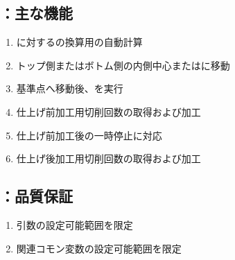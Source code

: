 \subsection{\KEndFaceInCChamferRLeft：主な機能}
\begin{enumerate}[label*=\sarrow]
\item \EndFaceInRChamfer に対するの換算用\EndFaceInCChamferWidth の自動計算
\item トップ側またはボトム側の\EndFace 内側中心または\IncutBoringMillingReferencePoint に移動
\item 基準点へ移動後、\KILeftFF を実行
\item 仕上げ前加工用切削回数の取得および加工
\item 仕上げ前加工後の一時停止\OpauseCheck に対応
\item 仕上げ後加工用切削回数の取得および加工
\end{enumerate}


\subsection{\KEndFaceInCChamferRLeft：品質保証}
\begin{enumerate}[label*=\sarrow]
\item {}引数の設定可能範囲を限定
\item 関連コモン変数の設定可能範囲を限定
\end{enumerate}
